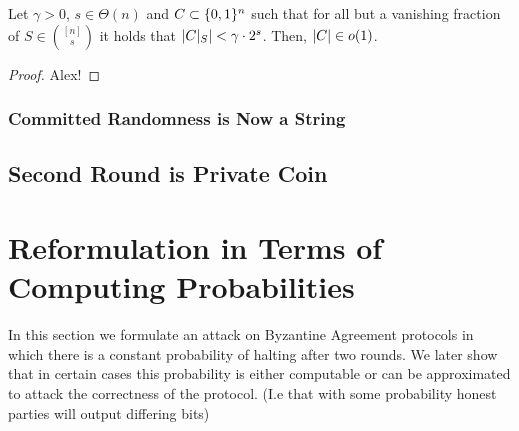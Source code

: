 \begin{lemma}\label{lemma6}
	Let $\gamma > 0$, $s \in \Theta(n)$ and $C \subset \{0,1\}^n$ such that for all but a vanishing fraction of $S \in {\binom{[n]}{s}}$ it holds that $\left|C|_{S}\right| < \gamma \cdot 2^s$. Then, $\left|C\right| \in o(1)$.  
\end{lemma}

\begin{proof}
	Alex!
\end{proof}

\subsubsection{Committed Randomness is Now a String}


\subsection{Second Round is Private Coin}


\section{Reformulation in Terms of Computing Probabilities}
In this section we formulate an attack on Byzantine Agreement protocols in which there is a constant probability of halting after two rounds. We later show that in certain cases this probability is either computable or can be approximated to attack the correctness of the protocol. (I.e that with some probability honest parties will output differing bits)